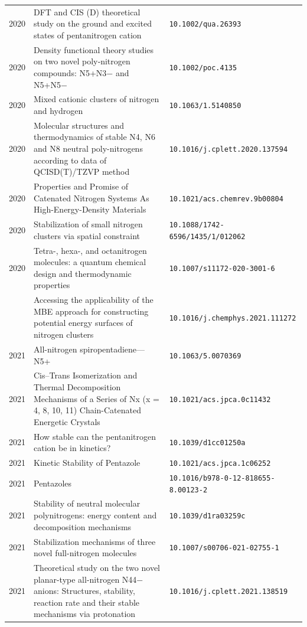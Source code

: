 \begin{longtable}{@{}p{1.0cm}p{10.5cm}p{3.5cm}@{}}
2020 & DFT and CIS (D) theoretical study on the ground and excited states of pentanitrogen cation & \small\texttt{10.1002/qua.26393} \\
2020 & Density functional theory studies on two novel poly‐nitrogen compounds: N5+N3− and N5+N5− & \small\texttt{10.1002/poc.4135} \\
2020 & Mixed cationic clusters of nitrogen and hydrogen & \small\texttt{10.1063/1.5140850} \\
2020 & Molecular structures and thermodynamics of stable N4, N6 and N8 neutral poly-nitrogens according to data of QCISD(T)/TZVP method & \small\texttt{10.1016/j.cplett.2020.137594} \\
2020 & Properties and Promise of Catenated Nitrogen Systems As High-Energy-Density Materials & \small\texttt{10.1021/acs.chemrev.9b00804} \\
2020 & Stabilization of small nitrogen clusters via spatial constraint & \small\texttt{10.1088/1742-6596/1435/1/012062} \\
2020 & Tetra-, hexa-, and octanitrogen molecules: a quantum chemical design and thermodynamic properties & \small\texttt{10.1007/s11172-020-3001-6} \\
\addlinespace
2021 & Accessing the applicability of the MBE approach for constructing potential energy surfaces of nitrogen clusters & \small\texttt{10.1016/j.chemphys.2021.111272} \\
2021 & All-nitrogen spiropentadiene—N5+ & \small\texttt{10.1063/5.0070369} \\
2021 & Cis–Trans Isomerization and Thermal Decomposition Mechanisms of a Series of Nx (x = 4, 8, 10, 11) Chain-Catenated Energetic Crystals & \small\texttt{10.1021/acs.jpca.0c11432} \\
2021 & How stable can the pentanitrogen cation be in kinetics? & \small\texttt{10.1039/d1cc01250a} \\
2021 & Kinetic Stability of Pentazole & \small\texttt{10.1021/acs.jpca.1c06252} \\
2021 & Pentazoles & \small\texttt{10.1016/b978-0-12-818655-8.00123-2} \\
2021 & Stability of neutral molecular polynitrogens: energy content and decomposition mechanisms & \small\texttt{10.1039/d1ra03259c} \\
2021 & Stabilization mechanisms of three novel full-nitrogen molecules & \small\texttt{10.1007/s00706-021-02755-1} \\
2021 & Theoretical study on the two novel planar-type all-nitrogen N44− anions: Structures, stability, reaction rate and their stable mechanisms via protonation & \small\texttt{10.1016/j.cplett.2021.138519} \\

\end{longtable}
